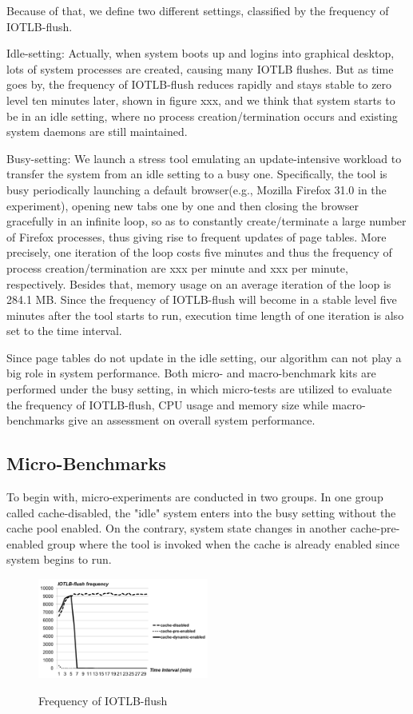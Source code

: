Because of that, we define two different settings, classified by the frequency of IOTLB-flush.

Idle-setting: Actually, when system boots up and logins into graphical desktop, lots of system processes are created, causing many IOTLB flushes. But as time goes by, the frequency of IOTLB-flush reduces rapidly and stays stable to zero level ten minutes later, shown in figure xxx, and we think that system starts to be in an idle setting, where no process creation/termination occurs and existing system daemons are still maintained.

Busy-setting: We launch a stress tool emulating an update-intensive workload to transfer the system from an idle setting to a busy one. Specifically, the tool is busy periodically launching a default browser(e.g., Mozilla Firefox 31.0 in the experiment), opening new tabs one by one and then closing the browser gracefully in an infinite loop, so as to constantly create/terminate a large number of Firefox processes, thus giving rise to frequent updates of page tables. More precisely, one iteration of the loop costs five minutes and thus the frequency of process creation/termination are xxx per minute and xxx per minute, respectively. Besides that, memory usage on an average iteration of the loop is 284.1 MB. Since the frequency of IOTLB-flush will become in a stable level five minutes after the tool starts to run, execution time length of one iteration is also set to the time interval.

Since page tables do not update in the idle setting, our algorithm can not play a big role in system performance. Both micro- and macro-benchmark kits are performed under the busy setting, in which micro-tests are utilized to evaluate the frequency of IOTLB-flush, CPU usage and memory size while macro-benchmarks give an assessment on overall system performance.

\subsection{Micro-Benchmarks}

To begin with, micro-experiments are conducted in two groups. In one group called cache-disabled, the "idle" system enters into the busy setting without the cache pool enabled. On the contrary, system state changes in another cache-pre-enabled group where the tool is invoked when the cache is already enabled since system begins to run.

\begin{figure}[ht]
\centering
\includegraphics[width=0.5\textwidth]{image/micro/iotlbflush.png} \\
\caption{Frequency of IOTLB-flush}
\label{fig:iotlbflush}
\end{figure}

